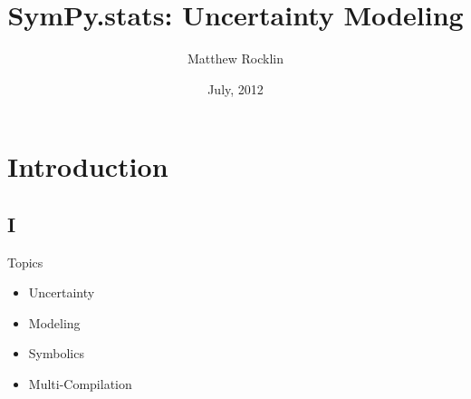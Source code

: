 \documentclass[compress, blue]{beamer}
\begin{document}
\title{SymPy.stats: Uncertainty Modeling}
\author{Matthew Rocklin}
\date{July, 2012}

\begin{frame}
\maketitle
\end{frame}

\section{Introduction}
\subsection{I}

\begin{frame}{Topics}
    \begin{itemize}
        \item Uncertainty
        \item Modeling
        \item Symbolics
        \item Multi-Compilation
    \end{itemize}
\end{frame}
\end{document}
